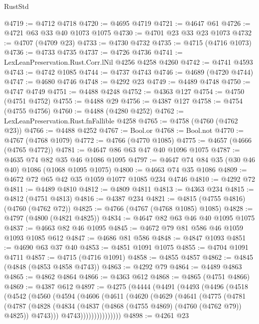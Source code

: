 \begin{lexlean}{RustStd}
\begin{coremodule}
@4719 := @4712 @4718
@4720 := @4695 @4719
@4721 := @4647 @61
@4726 := @4721 @63 @33 @40 @1073 @1075
@4730 := @4701 @23 @33 @23 @1073
@4732 := @4707 (@4709 @23)
@4733 := @4730 @4732
@4735 := @4715 (@4716 @1073)
@4736 := @4733 @4735
@4737 := @4726 @4736
@4741 := LexLeanPreservation.Rust.Corr.lNil @4256 @4258 @4260
@4742 := @4741 @4593
@4743 := @4742 @1085
@4744 := @4737 @4743
@4746 := @4689 (@4720 @4744)
@4747 := @4680 @4746
@4748 := @4292 @23
@4749 := @4489 @4748
@4750 := @4747 @4749
@4751 := @4488 @4248
@4752 := @4363 @127
@4754 := @4750 (@4751 @4752)
@4755 := @4488 @29
@4756 := @4387 @127
@4758 := @4754 (@4755 @4756)
@4760 := @4488 (@4280 @4252)
@4762 := LexLeanPreservation.Rust.fnFallible @4258
@4765 := @4758 (@4760 (@4762 @23))
@4766 := @4488 @4252
@4767 := Bool.or
@4768 := Bool.not
@4770 := @4767 (@4768 @1079)
@4772 := @4766 (@4770 @1085)
@4775 := @4657 (@4666 (@4765 @4772))
@4781 := @4647 @86 @63 @47 @40 @1096 @1075
@4787 := @4635 @74 @82 @35 @46 @1086 @1095
@4797 := @4647 @74 @84 @35 (@30 @46 @40) @1086 (@1068 @1095 @1075)
@4800 := @4663 @74 @35 @1086
@4809 := @4672 @72 @65 @42 @35 @1059 @1077 @1085 @234 @4746
@4810 := @4292 @72
@4811 := @4489 @4810
@4812 := @4809 @4811
@4813 := @4363 @234
@4815 := @4812 (@4751 @4813)
@4816 := @4387 @234
@4821 := @4815 (@4755 @4816) (@4760 (@4762 @72))
@4825 := @4766 (@4767 (@4768 @1085) @1085)
@4828 := @4797 (@4800 (@4821 @4825))
@4834 := @4647 @82 @63 @46 @40 @1095 @1075
@4837 := @4663 @82 @46 @1095
@4845 := @4672 @79 @81 @586 @46 @1059 @1093 @1085 @612
@4847 := @4686 @81 @586
@4848 := @4847 @1093
@4851 := @4690 @63 @37 @40
@4853 := @4851 @1091 @1075
@4855 := @4704 @1091 @4711
@4857 := @4715 (@4716 @1091)
@4858 := @4855 @4857
@4862 := @4845 (@4848 (@4853 @4858 @4743))
@4863 := @4292 @79
@4864 := @4489 @4863
@4865 := @4862 @4864
@4866 := @4363 @612
@4868 := @4865 (@4751 @4866)
@4869 := @4387 @612
@4897 := @4275
    (@4444
      (@4491
        (@4493
          (@4496
            (@4518
              (@4542
                (@4560
                  (@4594
                    (@4606
                      (@4611
                        (@4620
                          (@4629
                            (@4641
                              (@4775
                                (@4781
                                  (@4787
                                    (@4828
                                      (@4834
                                        (@4837 (@4868 (@4755 @4869) (@4760 (@4762 @79)) @4825))
                                        @4743)))
                                  @4743)))))))))))))))
@4898 := @4261 @23

\end{coremodule}
\end{lexlean}

